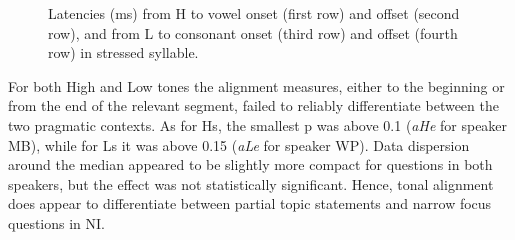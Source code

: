 \begin{figure}
\centering
{}
\caption{Latencies (ms) from H to vowel onset (first row) and offset (second row), and from L to consonant onset (third row) and offset (fourth row) in stressed syllable.}
\label{fig206}\end{figure}

For both High and Low tones the alignment measures, either to the beginning or from the end of the relevant segment, failed to reliably differentiate between the two pragmatic contexts. As for Hs, the smallest p was above 0.1 (\textit{aHe} for speaker MB), while for Ls it was above 0.15 (\textit{aLe} for speaker WP). Data dispersion around the median appeared to be slightly more compact for questions in both speakers, but the effect was not statistically significant. Hence, tonal alignment does appear to differentiate between partial topic statements and narrow focus questions in NI.

